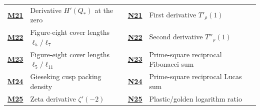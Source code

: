\documentclass[11pt,a4paper]{article}
\theoremstyle{definition}
\theoremstyle{remark}
\begin{document}
{\begin{tabularx}{\textwidth}{@{}l>{\raggedright\arraybackslash}Xrl>{\raggedright\arraybackslash}Xr@{}}
\hyperlink{cat-M21}{\textbf{M21}} & Derivative $H'(Q_*)$ at the zero & \pageref*{page:M21} & \hyperlink{cat-N21}{\textbf{N21}} & First derivative $T'_\rho(1)$ & \pageref*{page:N21} \\
\hyperlink{cat-M22}{\textbf{M22}} & Figure-eight cover lengths $\ell_5/\ell_7$ & \pageref*{page:M22} & \hyperlink{cat-N22}{\textbf{N22}} & Second derivative $T''_\rho(1)$ & \pageref*{page:N22} \\
\hyperlink{cat-M23}{\textbf{M23}} & Figure-eight cover lengths $\ell_5/\ell_{11}$ & \pageref*{page:M23} & \hyperlink{cat-N23}{\textbf{N23}} & Prime-square reciprocal Fibonacci sum & \pageref*{page:N23} \\
\hyperlink{cat-M24}{\textbf{M24}} & Gieseking cusp packing density & \pageref*{page:M24} & \hyperlink{cat-N24}{\textbf{N24}} & Prime-square reciprocal Lucas sum & \pageref*{page:N24} \\
\hyperlink{cat-M25}{\textbf{M25}} & Zeta derivative $\zeta'(-2)$ & \pageref*{page:M25} & \hyperlink{cat-N25}{\textbf{N25}} & Plastic/golden logarithm ratio & \pageref*{page:N25} \\
\bottomrule\end{tabularx}}
\clearpage{}\label{sec:ref}
\end{document}
